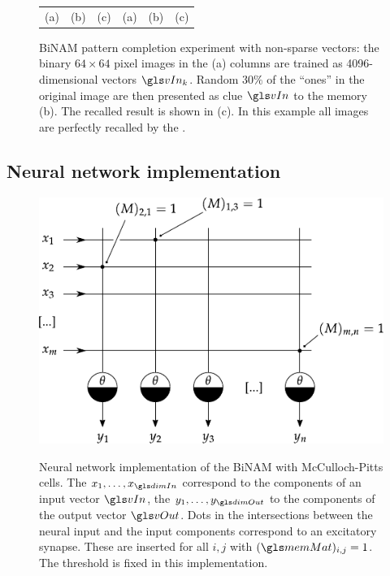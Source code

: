 \begin{figure}
\begin{tabular}{c c c c c c}
		(a) & (b) & (c) & (a) & (b) & (c)
	\end{tabular}
	\caption[BiNAM pattern completion experiment]{BiNAM pattern completion experiment with non-sparse vectors: the binary $64 \times 64$ pixel images in the (a) columns are trained as 4096-dimensional vectors $\vIn_k$. Random $30\%$ of the \enquote{ones} in the original image are then presented as clue $\vIn$ to the memory (b). The recalled result is shown in (c). In this example all images are perfectly recalled by the \BiNAM.}
	\label{fig:binam_pattern_completion}
\end{figure}

\subsection{Neural network implementation}
\label{sec:binam_neural_network}

\begin{figure}
	\centering
	\includegraphics{media/chp2/binam_network.pdf}\\
	\caption[Neural network implementation of the BiNAM]{Neural network implementation of the BiNAM with McCulloch-Pitts cells. The $x_1, \ldots, x_{\dimIn}$ correspond to the components of an input vector $\vIn$, the $y_1, \ldots, y_{\dimOut}$ to the components of the output vector $\vOut$. Dots in the intersections between the neural input and the input components correspond to an excitatory synapse. These are inserted for all $i, j$ with $(\memMat)_{i, j} = 1$. The threshold \threshold is fixed in this implementation.}
	\label{fig:binam_network}
\end{figure}

